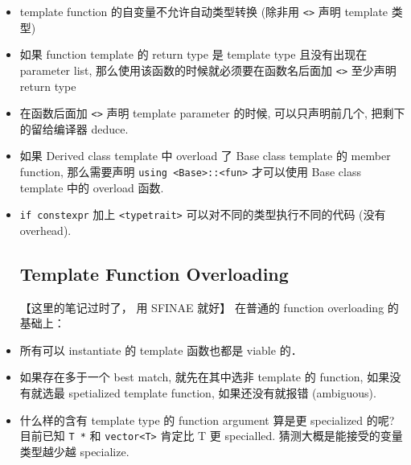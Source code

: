 
\begin{issues}
\issueDraft
\end{issues}

\begin{itemize}
\item template function 的自变量不允许自动类型转换 (除非用 \verb`<>` 声明 template 类型)
\item 如果 function template 的 return type 是 template type 且没有出现在 parameter list, 那么使用该函数的时候就必须要在函数名后面加 \verb`<>` 至少声明 return type
\item 在函数后面加 \verb`<>` 声明 template parameter 的时候, 可以只声明前几个, 把剩下的留给编译器 deduce.
\item 如果 Derived class template 中 overload 了 Base class template 的 member function, 那么需要声明 \verb`using <Base>::<fun>` 才可以使用 Base class template 中的 overload 函数.
\item \verb`if constexpr` 加上 \verb`<typetrait>` 可以对不同的类型执行不同的代码 (没有 overhead).

\subsection{Template Function Overloading}
【这里的笔记过时了， 用 SFINAE 就好】
在普通的 function overloading 的基础上：
\item 所有可以 instantiate 的 template 函数也都是 viable 的．
\item 如果存在多于一个 best match, 就先在其中选非 template 的 function, 如果没有就选最 spetialized template function, 如果还没有就报错 (ambiguous).
\item 什么样的含有 template type 的 function argument 算是更 specialized 的呢? 目前已知 \verb|T *| 和 \verb|vector<T>| 肯定比 T 更 specialled. 猜测大概是能接受的变量类型越少越 specialize.


\end{itemize}
